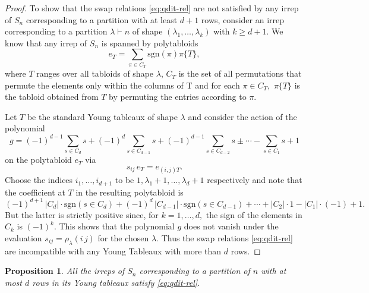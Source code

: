 \documentclass[12pt,dvipsnames,accepted=2016-08-18,a4paper,onecolumn]{quantumarticle}
\numberwithin{equation}{section}
\newtheorem{proposition}[theorem]{Proposition}
\theoremstyle{definition}
\begin{document}
\begin{proof}
	To show that the swap relations \eqref{eq:qdit-rel} are not satisfied by any irrep of $S_n$ corresponding to a partition with at least $d+1$ rows, consider an irrep corresponding to a partition $\lambda \vdash n$ of shape $(\lambda_1,\ldots,\lambda_k)$ with $k\geq d+1.$ We know that any irrep of $S_n$ is spanned by polytabloids 
	$$
	e_T = \sum_{\pi \in C_T} \text{sgn}(\pi) \pi\{T\},
	$$ 
	where $T$ ranges over all tabloids of shape $\lambda$, $C_T$ is the set of all permutations that permute the elements only within the columns of T and for each $\pi \in C_T,$  $\pi\{T\}$ is the tabloid obtained from $T$ by permuting the entries according to $\pi.$ 
	
	 Let $T$ be the standard Young tableaux of shape $\lambda$ and consider the action of the polynomial 
	$$
	g = (-1)^{d-1} \sum_{s \in C_d} s + (-1)^{d} \sum_{s \in C_{d-1}} s + (-1)^{d-1}\sum_{s \in C_{d-2}} s \pm \cdots - \sum_{s \in C_1} s + 1
	$$ 
	on the polytabloid $e_T$ via
	$$
	s_{ij}\, e_T = e_{(i,j)T}.
	$$
	Choose the indices $i_1, \ldots, i_{d+1}$ to be $1, \lambda_1 +1, \ldots ,\lambda_{d} +1$ respectively and note that the coefficient at $T$ in the resulting polytabloid is 
	$$
	(-1)^{d+1}\,|C_{d}| \cdot\text{sgn}(s \in C_{d}) +(-1)^d \,|C_{d-1}| \cdot\text{sgn}(s \in C_{d-1})+    \cdots+|C_2|\cdot 1-|C_1|\cdot(-1)+1.
	$$
	But the latter is strictly positive since, for $k=1,\ldots,d,$ the sign of the elements in $C_k$ is $(-1)^k.$ This shows that the polynomial $g$ does not vanish under the evaluation $s_{ij} = \rho_\lambda(i\,j)$ for the chosen $\lambda.$ Thus
	the swap relations \eqref{eq:qdit-rel} are incompatible with any Young Tableaux with more than $d$ rows. 
\end{proof}


	\begin{proposition} \label{prop: leq d}
		 All the irreps of $S_n$ corresponding to a partition of $n$ with at most $d$ rows in its Young tableaux satisfy \eqref{eq:qdit-rel}.
	\end{proposition}
\end{document}
